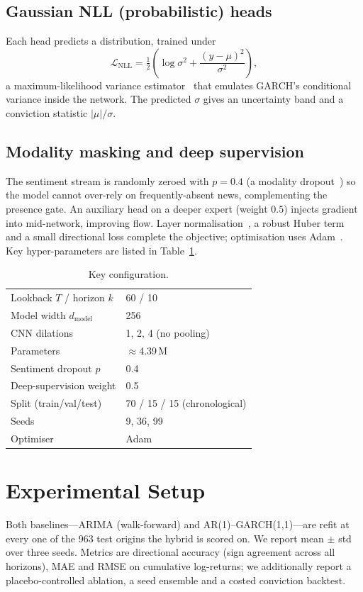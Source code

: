 \documentclass[conference]{IEEEtran}
\begin{document}
\subsection{Gaussian NLL (probabilistic) heads}
Each head predicts a distribution, trained under
\begin{equation}
\mathcal{L}_{\text{NLL}}=\tfrac12\!\left(\log\sigma^2+\frac{(y-\mu)^2}{\sigma^2}\right),
\end{equation}
a maximum-likelihood variance estimator~\cite{nix} that emulates GARCH's conditional
variance inside the network. The predicted $\sigma$ gives an uncertainty band and a
conviction statistic $|\mu|/\sigma$.
\subsection{Modality masking and deep supervision}
The sentiment stream is randomly zeroed with $p{=}0.4$ (a modality dropout~\cite{dropout})
so the model cannot over-rely on frequently-absent news, complementing the presence gate.
An auxiliary head on a deeper expert (weight $0.5$) injects gradient into mid-network,
improving flow. Layer normalisation~\cite{layernorm}, a robust Huber term~\cite{huber} and a
small directional loss complete the objective; optimisation uses Adam~\cite{adam}. Key
hyper-parameters are listed in Table~\ref{tab:hp}.

\begin{table}[t]
\caption{Key configuration.}
\label{tab:hp}
\centering
\begin{tabular}{@{}ll@{}}
\toprule
Lookback $T$ / horizon $k$ & 60 / 10 \\
Model width $d_\text{model}$ & 256 \\
CNN dilations & 1, 2, 4 (no pooling) \\
Parameters & $\approx$4.39\,M \\
Sentiment dropout $p$ & 0.4 \\
Deep-supervision weight & 0.5 \\
Split (train/val/test) & 70 / 15 / 15 (chronological) \\
Seeds & 9, 36, 99 \\
Optimiser & Adam \\
\bottomrule
\end{tabular}
\end{table}

\section{Experimental Setup}
Both baselines---ARIMA (walk-forward) and AR(1)--GARCH(1,1)---are refit at every one of the
963 test origins the hybrid is scored on. We report mean $\pm$ std over three seeds. Metrics
are directional accuracy (sign agreement across all horizons), MAE and RMSE on cumulative
log-returns; we additionally report a placebo-controlled ablation, a seed ensemble and a
costed conviction backtest.
\end{document}
